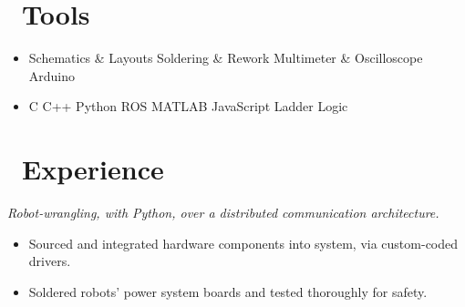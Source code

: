 \documentclass{resume}
\begin{document}



\section{\faWrench\ Tools}

\begin{itemize}[parsep=0.5ex]
  \item %
  Schematics \& Layouts\textperiodcentered
  Soldering \& Rework\textperiodcentered
  Multimeter \& Oscilloscope\textperiodcentered
  Arduino
  \hfill \faBolt

  \item %
  C\textperiodcentered 
  C++\textperiodcentered
  Python\textperiodcentered
  ROS\textperiodcentered
  MATLAB\textperiodcentered
  JavaScript\textperiodcentered
  Ladder Logic
  \hfill \faCode

\end{itemize}

\section{\faLineChart\ Experience}

\textit{Robot-wrangling, with Python, over a distributed communication architecture.}
\begin{itemize}
  \item Sourced and integrated hardware components into system, via custom-coded drivers.
  \item Soldered robots' power system boards and tested thoroughly for safety.
\end{itemize}
\begin{comment}
  Informal intro to ML / N-nets, FK / IK, Grasping, FSM, DB (ES)
  People skills: pair-programming, 1-on-1, standups, blog posts, Happy Hour, AI planning, CI for internal processes, HW concept review
  Python fu: rapid prototyping / scripting AND enterprise-level code --> classes, exception-handling, logging, PDB debugging, linting, documentation
\end{comment}
\end{document}
